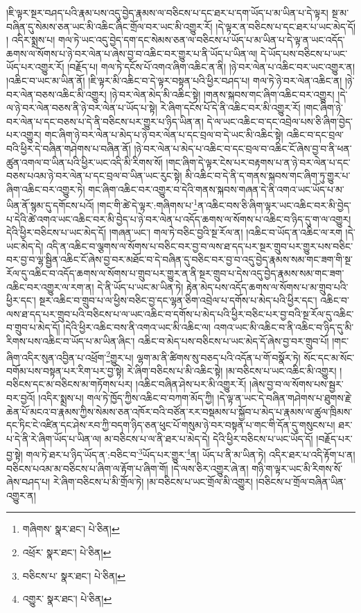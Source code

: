 །ཇི་ལྟར་སྔར་བཤད་པའི་རྣམ་པས་འདུ་བྱེད་རྣམས་ལ་བཅིངས་པ་དང་ཐར་པ་དག་ཡོད་པ་མ་ཡིན་པ་དེ་ལྟར། སྔ་མ་བཞིན་དུ་སེམས་ཅན་ཡང་མི་འཆིང་ཞིང་གྲོལ་བར་ཡང་མི་འགྱུར་རོ། །དེ་ལྟར་ན་བཅིངས་པ་དང་ཐར་པ་ཡང་མེད་དོ། །
འདིར་སྨྲས་པ། གལ་ཏེ་ཡང་འདུ་བྱེད་དག་དང་སེམས་ཅན་ལ་བཅིངས་པ་ཡོད་པ་མ་ཡིན་པ་དེ་ལྟ་ན་ཡང་འདོད་ཆགས་ལ་སོགས་པ་ཉེ་བར་ལེན་པ་ཞེས་བྱ་བ་འཆིང་བར་གྱུར་པ་ནི་ཡོད་པ་ཡིན་ལ། དེ་ཡོད་པས་བཅིངས་པ་ཡང་ཡོད་པར་འགྱུར་རོ། །བརྗོད་པ། གལ་ཏེ་དངོས་པོ་འགའ་ཞིག་འཆིང་ན་ནི། །ཉེ་བར་ལེན་པ་འཆིང་བར་ཡང་འགྱུར་ན། །འཆིང་བ་ཡང་མ་ཡིན་ནོ། །ཇི་ལྟར་མི་འཆིང་བ་དེ་ལྟར་བསྟན་པའི་ཕྱིར་བཤད་པ། གལ་ཏེ་ཉེ་བར་ལེན་འཆིང་ན། །ཉེ་བར་ལེན་བཅས་འཆིང་མི་འགྱུར། །ཉེ་བར་ལེན་མེད་མི་འཆིང་སྟེ། །གནས་སྐབས་གང་ཞིག་འཆིང་བར་འགྱུར། །དེ་ལ་ཉེ་བར་ལེན་བཅས་ནི་ཉེ་བར་ལེན་པ་ཡོད་པ་སྟེ། རེ་ཞིག་དངོས་པོ་དེ་ནི་འཆིང་བར་མི་འགྱུར་རོ། །གང་ཞིག་ཉེ་བར་ལེན་པ་དང་བཅས་པ་དེ་ནི་བཅིངས་པར་གྱུར་པ་ཉིད་ཡིན་ན། དེ་ལ་ཡང་འཆིང་བ་དང་འབྲེལ་པས་ཅི་ཞིག་བྱེད་པར་འགྱུར། གང་ཞིག་ཉེ་བར་ལེན་པ་མེད་པ་ཉེ་བར་ལེན་པ་དང་བྲལ་བ་དེ་ཡང་མི་འཆིང་སྟེ། འཆིང་བ་དང་བྲལ་བའི་ཕྱིར་དེ་བཞིན་གཤེགས་པ་བཞིན་ནོ། །ཉེ་བར་ལེན་པ་མེད་པ་འཆིང་བ་དང་བྲལ་བ་འཆིང་ངོ་ཞེས་བྱ་བ་ནི་ཕན་ཚུན་འགལ་བ་ཡིན་པའི་ཕྱིར་ཡང་འདི་མི་རིགས་སོ། །གང་ཞིག་དེ་ལྟར་ངེས་པར་བརྟགས་པ་ན་ཉེ་བར་ལེན་པ་དང་བཅས་པའམ་ཉེ་བར་ལེན་པ་དང་བྲལ་བ་ཡིན་ཡང་རུང་སྟེ། མི་འཆིང་བ་དེ་ནི་ད་གནས་སྐབས་གང་ཞིག་ཏུ་གྱུར་པ་ཞིག་འཆིང་བར་འགྱུར་ཏེ། གང་ཞིག་འཆིང་བར་འགྱུར་བ་དེའི་གནས་སྐབས་གཞན་དེ་ནི་འགའ་ཡང་ཡོད་པ་མ་ཡིན་ནོ་སྙམ་དུ་དགོངས་པའོ། །གང་གི་ཚེ་དེ་ལྟར་:གཞིགས་པ་\footnote{གཞིགས་  སྣར་ཐང་།  པེ་ཅིན། }ན་འཆིང་བས་ཅི་ཞིག་ལྟར་ཡང་འཆིང་བར་མི་བྱེད་པ་དེའི་ཚེ་འགའ་ཡང་འཆིང་བར་མི་བྱེད་པ་ཉེ་བར་ལེན་པ་འདོད་ཆགས་ལ་སོགས་པ་འཆིང་བ་ཉིད་དུ་ག་ལ་འགྱུར། དེའི་ཕྱིར་བཅིངས་པ་ཡང་མེད་དོ། །གཞན་ཡང་། གལ་ཏེ་བཅིང་བྱའི་སྔ་རོལ་ན། །འཆིང་བ་ཡོད་ན་འཆིང་ལ་རག །དེ་ཡང་མེད་དེ། འདི་ན་འཆིང་བ་ལྕགས་ལ་སོགས་པ་བཅིང་བར་བྱ་བ་ལས་ཐ་དད་པར་སྔར་གྲུབ་པར་གྱུར་པས་བཅིང་བར་བྱ་བ་ལྷ་སྦྱིན་འཆིང་ངོ་ཞེས་བྱ་བར་མཐོང་བ་དེ་བཞིན་དུ་བཅིང་བར་བྱ་བ་འདུ་བྱེད་རྣམས་སམ་གང་ཟག་གི་སྔ་རོལ་དུ་འཆིང་བ་འདོད་ཆགས་ལ་སོགས་པ་གྲུབ་པར་གྱུར་ན་ནི་སྔར་གྲུབ་པ་དེས་འདུ་བྱེད་རྣམས་སམ་གང་ཟག་འཆིང་བར་འགྱུར་ལ་རག་ན། དེ་ནི་ཡོད་པ་ཡང་མ་ཡིན་ཏེ། རྟེན་མེད་པས་འདོད་ཆགས་ལ་སོགས་པ་མ་གྲུབ་པའི་ཕྱིར་དང་། སྔར་འཆིང་བ་གྲུབ་པ་ལ་ཕྱིས་བཅིང་བྱ་དང་ལྷན་ཅིག་འབྲེལ་པ་དགོས་པ་མེད་པའི་ཕྱིར་དང་། འཆིང་བ་ལས་ཐ་དད་པར་གྲུབ་པའི་བཅིངས་པ་ལ་ཡང་འཆིང་བ་དགོས་པ་མེད་པའི་ཕྱིར་བཅིང་པར་བྱ་བའི་སྔ་རོལ་དུ་འཆིང་བ་གྲུབ་པ་མེད་དོ། །དེའི་ཕྱིར་འཆིང་བས་ནི་འགའ་ཡང་མི་འཆིང་ལ། འགའ་ཡང་མི་འཆིང་བ་ནི་འཆིང་བ་ཉིད་དུ་མི་རིགས་པས་འཆིང་བ་ཡོད་པ་མ་ཡིན་ཞིང་། འཆིང་བ་མེད་པས་བཅིངས་པ་ཡང་མེད་དོ་ཞེས་བྱ་བར་གྲུབ་པོ། །གང་ཞིག་འདིར་སུན་འབྱིན་པ་འཕྲོག་\footnote{འཕྲོར་  སྣར་ཐང་།  པེ་ཅིན། }གྱུར་པ། ལྷག་མ་ནི་ཚིགས་སུ་བཅད་པའི་འདོན་པ་གོ་བསྣོར་ཏེ། སོང་དང་མ་སོང་བགོམ་པས་བསྟན་པར་རིག་པར་བྱ་སྟེ། རེ་ཞིག་བཅིངས་པ་མི་འཆིང་སྟེ། །མ་བཅིངས་པ་ཡང་འཆིང་མི་འགྱུར། །བཅིངས་དང་མ་བཅིངས་མ་གཏོགས་པར། །འཆིང་བཞིན་ཤེས་པར་མི་འགྱུར་རོ། །ཞེས་བྱ་བ་ལ་སོགས་པས་སྦྱར་བར་བྱའོ། །འདིར་སྨྲས་པ། གལ་ཏེ་ཁྱོད་ཀྱིས་འཆིང་བ་བཀག་མོད་ཀྱི། །དེ་ལྟ་ན་ཡང་དེ་བཞིན་གཤེགས་པ་ཐུགས་རྗེ་ཆེན་པོ་མངའ་བ་རྣམས་ཀྱིས་སེམས་ཅན་འཁོར་བའི་བཙོན་རར་བསྡམས་པ་སྐྱོབ་པ་མེད་པ་རྣམས་ལ་ཚུལ་ཁྲིམས་དང་ཏིང་ངེ་འཛིན་དང་ཤེས་རབ་ཀྱི་བདག་ཉིད་ཅན་ཕུང་པོ་གསུམ་ཉེ་བར་བསྟན་པ་གང་གི་དོན་དུ་གསུངས་པ། ཐར་པ་དེ་ནི་རེ་ཞིག་ཡོད་པ་ཡིན་ལ། མ་བཅིངས་པ་ལ་ནི་ཐར་པ་མེད་དེ། དེའི་ཕྱིར་བཅིངས་པ་ཡང་ཡོད་དོ། །བརྗོད་པར་བྱ་སྟེ། གལ་ཏེ་ཐར་པ་ཉིད་ཡོད་ན་:བཅིང་བ་\footnote{བཅིངས་པ་  སྣར་ཐང་།  པེ་ཅིན། }ཡོད་པར་གྱུར་\footnote{འགྱུར་  སྣར་ཐང་།  པེ་ཅིན། }ན། ཡོད་པ་ནི་མ་ཡིན་ཏེ། འདིར་ཐར་པ་འདི་རྟོག་པ་ན། བཅིངས་པའམ་མ་བཅིངས་པ་ཞིག་ལ་རྟོག་པ་ཞིག་གོ། །དེ་ལས་ཅིར་འགྱུར་ཞེ་ན། གཉི་ག་ལྟར་ཡང་མི་རིགས་སོ་ཞེས་བཤད་པ། རེ་ཞིག་བཅིངས་པ་མི་གྲོལ་ཏེ། །མ་བཅིངས་པ་ཡང་གྲོལ་མི་འགྱུར། །བཅིངས་པ་གྲོལ་བཞིན་ཡིན་འགྱུར་ན། 